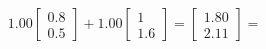\documentclass[preview]{standalone}
\begin{document}
\begin{align*}
1.00 \begin{bmatrix} 0.8 \\ 0.5 \end{bmatrix} + 1.00 \begin{bmatrix} 1 \\ 1.6 \end{bmatrix} = \begin{bmatrix} 1.80 \\ 2.11 \end{bmatrix} =
\end{align*}
\end{document}
